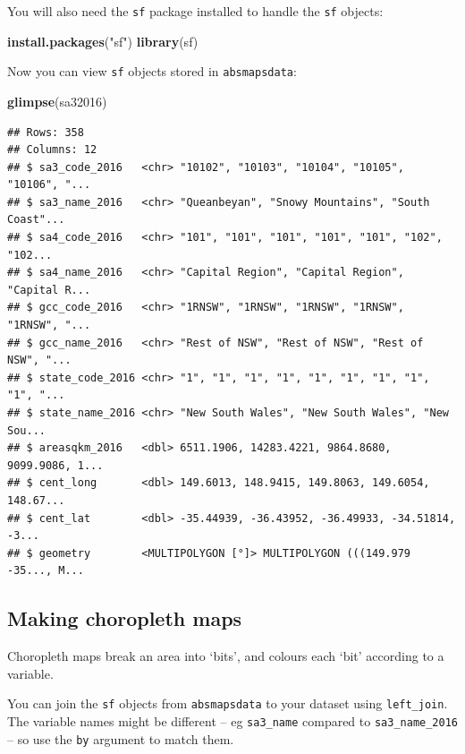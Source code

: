 \documentclass[]{book}
\newenvironment{Shaded}{\begin{snugshade}}{\end{snugshade}}
\newcommand{\KeywordTok}[1]{\textcolor[rgb]{0.13,0.29,0.53}{\textbf{#1}}}
\newcommand{\NormalTok}[1]{#1}
\newcommand{\StringTok}[1]{\textcolor[rgb]{0.31,0.60,0.02}{#1}}
\begin{document}
You will also need the \texttt{sf} package installed to handle the \texttt{sf} objects:

\begin{Shaded}
\begin{Highlighting}[]
\KeywordTok{install.packages}\NormalTok{(}\StringTok{"sf"}\NormalTok{)}
\KeywordTok{library}\NormalTok{(sf)}
\end{Highlighting}
\end{Shaded}

Now you can view \texttt{sf} objects stored in \texttt{absmapsdata}:

\begin{Shaded}
\begin{Highlighting}[]
\KeywordTok{glimpse}\NormalTok{(sa32016)}
\end{Highlighting}
\end{Shaded}

\begin{verbatim}
## Rows: 358
## Columns: 12
## $ sa3_code_2016   <chr> "10102", "10103", "10104", "10105", "10106", "...
## $ sa3_name_2016   <chr> "Queanbeyan", "Snowy Mountains", "South Coast"...
## $ sa4_code_2016   <chr> "101", "101", "101", "101", "101", "102", "102...
## $ sa4_name_2016   <chr> "Capital Region", "Capital Region", "Capital R...
## $ gcc_code_2016   <chr> "1RNSW", "1RNSW", "1RNSW", "1RNSW", "1RNSW", "...
## $ gcc_name_2016   <chr> "Rest of NSW", "Rest of NSW", "Rest of NSW", "...
## $ state_code_2016 <chr> "1", "1", "1", "1", "1", "1", "1", "1", "1", "...
## $ state_name_2016 <chr> "New South Wales", "New South Wales", "New Sou...
## $ areasqkm_2016   <dbl> 6511.1906, 14283.4221, 9864.8680, 9099.9086, 1...
## $ cent_long       <dbl> 149.6013, 148.9415, 149.8063, 149.6054, 148.67...
## $ cent_lat        <dbl> -35.44939, -36.43952, -36.49933, -34.51814, -3...
## $ geometry        <MULTIPOLYGON [°]> MULTIPOLYGON (((149.979 -35..., M...
\end{verbatim}

\hypertarget{making-choropleth-maps}{%
\subsection{Making choropleth maps}\label{making-choropleth-maps}}

Choropleth maps break an area into `bits', and colours each `bit' according to a variable.

You can join the \texttt{sf} objects from \texttt{absmapsdata} to your dataset using \texttt{left\_join}. The variable names might be different -- eg \texttt{sa3\_name} compared to \texttt{sa3\_name\_2016} -- so use the \texttt{by} argument to match them.
\end{document}
